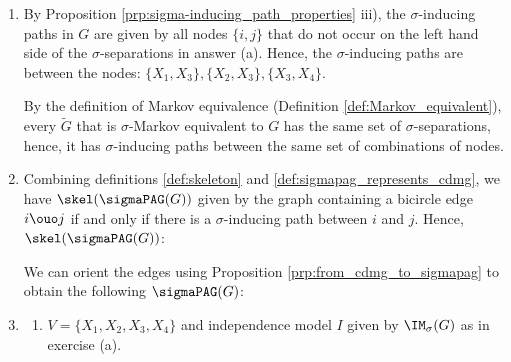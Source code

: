 \begin{enumerate}
\begin{ungradedsolution}
\begin{enumerate}
		\item By Proposition \ref*{prp:sigma-inducing_path_properties} iii), the $\sigma$-inducing paths in $G$ are given by all nodes $\{i,j\}$ that do not occur on the left hand side of the $\sigma$-separations in answer (a). Hence, the $\sigma$-inducing paths are between the nodes: $\{X_1, X_3\}, \{X_2, X_3\}, \{X_3, X_4\}$.
		
		By the definition of Markov equivalence (Definition \ref*{def:Markov_equivalent}), every $\tilde{G}$ that is $\sigma$-Markov equivalent to $G$ has the same set of $\sigma$-separations, hence, it has $\sigma$-inducing paths between the same set of combinations of nodes.
		\item Combining definitions \ref*{def:skeleton} and \ref*{def:sigmapag_represents_cdmg}, we have $\skel(\sigmaPAG(G))$ given by the graph containing a bicircle edge $i \ouo j$ if and only if there is a $\sigma$-inducing path between $i$ and $j$. Hence, $\skel(\sigmaPAG(G))$:
		\begin{center}
		\end{center}
		We can orient the edges using Proposition \ref*{prp:from_cdmg_to_sigmapag} to obtain the following $\sigmaPAG(G)$:
		\begin{center}
		\end{center}
		\item 
		\begin{enumerate}[label=\arabic*)]
			\item $V = \{X_1, X_2, X_3, X_4\}$ and independence model $I$ given by $\IM_\sigma(G)$ as in exercise (a).

\end{enumerate}
\end{enumerate}
\end{ungradedsolution}
\end{enumerate}
